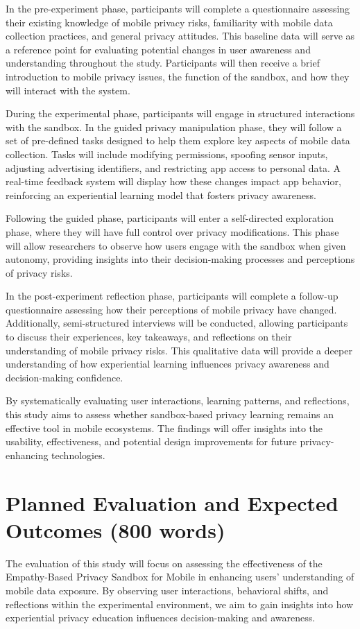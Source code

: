 \documentclass[acmlarge, nonacm]{acmart}
\begin{document}
In the pre-experiment phase, participants will complete a questionnaire assessing their existing knowledge of mobile privacy risks, familiarity with mobile data collection practices, and general privacy attitudes. This baseline data will serve as a reference point for evaluating potential changes in user awareness and understanding throughout the study. Participants will then receive a brief introduction to mobile privacy issues, the function of the sandbox, and how they will interact with the system.

During the experimental phase, participants will engage in structured interactions with the sandbox. In the guided privacy manipulation phase, they will follow a set of pre-defined tasks designed to help them explore key aspects of mobile data collection. Tasks will include modifying permissions, spoofing sensor inputs, adjusting advertising identifiers, and restricting app access to personal data. A real-time feedback system will display how these changes impact app behavior, reinforcing an experiential learning model that fosters privacy awareness.

Following the guided phase, participants will enter a self-directed exploration phase, where they will have full control over privacy modifications. This phase will allow researchers to observe how users engage with the sandbox when given autonomy, providing insights into their decision-making processes and perceptions of privacy risks.

In the post-experiment reflection phase, participants will complete a follow-up questionnaire assessing how their perceptions of mobile privacy have changed. Additionally, semi-structured interviews will be conducted, allowing participants to discuss their experiences, key takeaways, and reflections on their understanding of mobile privacy risks. This qualitative data will provide a deeper understanding of how experiential learning influences privacy awareness and decision-making confidence.

By systematically evaluating user interactions, learning patterns, and reflections, this study aims to assess whether sandbox-based privacy learning remains an effective tool in mobile ecosystems. The findings will offer insights into the usability, effectiveness, and potential design improvements for future privacy-enhancing technologies.

\section{Planned Evaluation and Expected Outcomes (800 words)}
The evaluation of this study will focus on assessing the effectiveness of the Empathy-Based Privacy Sandbox for Mobile in enhancing users' understanding of mobile data exposure. By observing user interactions, behavioral shifts, and reflections within the experimental environment, we aim to gain insights into how experiential privacy education influences decision-making and awareness.
\end{document}
